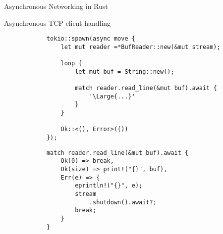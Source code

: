 \begin{frame}[fragile]{Asynchronous Networking in Rust}
    \begin{block}{Asynchronous TCP client handling}
        \begin{overprint}
            \begin{verbatim}
            tokio::spawn(async move {
                let mut reader =*BufReader::new(&mut stream);
            
                loop {
                    let mut buf = String::new();
            
                    match reader.read_line(&mut buf).await {
                        '\Large{...}'
                    }
                }
            
                Ok::<(), Error>(())
            });
            \end{verbatim}

            \begin{verbatim}
            match reader.read_line(&mut buf).await {
                Ok(0) => break,
                Ok(size) => print!("{}", buf),
                Err(e) => {
                    eprintln!("{}", e);
                    stream
                        .shutdown().await?;
                    break;
                }
            }
            \end{verbatim}
        \end{overprint}
    \end{block}

\end{frame}
